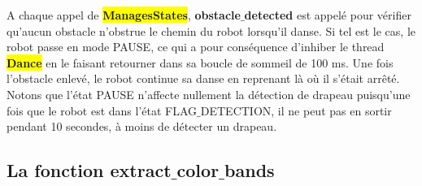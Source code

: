 \documentclass{article}
\begin{document}
    A chaque appel de \colorbox{yellow}{\textbf{ManagesStates}}, \textbf{obstacle$\_$detected} est appelé pour vérifier qu'aucun obstacle n'obstrue le chemin du robot lorsqu'il danse. Si tel est le cas, le robot passe en mode \textcolor{bleu}{PAUSE}, ce qui a pour conséquence d'inhiber le thread \colorbox{yellow}{\textbf{Dance}} en le faisant retourner dans sa boucle de sommeil de 100 ms. Une fois l'obstacle enlevé, le robot continue sa danse en reprenant là où il s'était arrêté. Notons que l'état \textcolor{bleu}{PAUSE} n'affecte nullement la détection de drapeau puisqu'une fois que le robot est dans l'état \textcolor{bleu}{FLAG$\_$DETECTION}, il ne peut pas en sortir pendant 10 secondes, à moins de détecter un drapeau.

    \subsection{La fonction extract$\_$color$\_$bands}
    \label{extract_color_bands}
\end{document}
